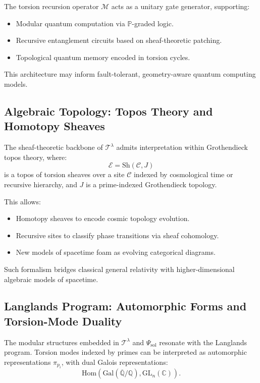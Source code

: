 \documentclass{article}
\theoremstyle{plain}
\begin{document}
The torsion recursion operator $\mathcal{M}$ acts as a unitary gate generator, supporting:
\begin{itemize}
    \item Modular quantum computation via $\mathbb{P}$-graded logic.
    \item Recursive entanglement circuits based on sheaf-theoretic patching.
    \item Topological quantum memory encoded in torsion cycles.
\end{itemize}

This architecture may inform fault-tolerant, geometry-aware quantum computing models.

\subsection{Algebraic Topology: Topos Theory and Homotopy Sheaves}

The sheaf-theoretic backbone of $\mathcal{T}^\lambda$ admits interpretation within Grothendieck topos theory, where:
\[
\mathcal{E} = \text{Sh}(\mathcal{C}, J)
\]
is a topos of torsion sheaves over a site $\mathcal{C}$ indexed by cosmological time or recursive hierarchy, and $J$ is a prime-indexed Grothendieck topology.

This allows:
\begin{itemize}
    \item Homotopy sheaves to encode cosmic topology evolution.
    \item Recursive sites to classify phase transitions via sheaf cohomology.
    \item New models of spacetime foam as evolving categorical diagrams.
\end{itemize}

Such formalism bridges classical general relativity with higher-dimensional algebraic models of spacetime.

\subsection{Langlands Program: Automorphic Forms and Torsion-Mode Duality}

The modular structures embedded in $\mathcal{T}^\lambda$ and $\Psi_{\text{sol}}$ resonate with the Langlands program. Torsion modes indexed by primes can be interpreted as automorphic representations $\pi_{p_i}$, with dual Galois representations:
\[
\text{Hom}(\text{Gal}(\overline{\mathbb{Q}}/\mathbb{Q}), \text{GL}_n(\mathbb{C})).
\]
\end{document}
